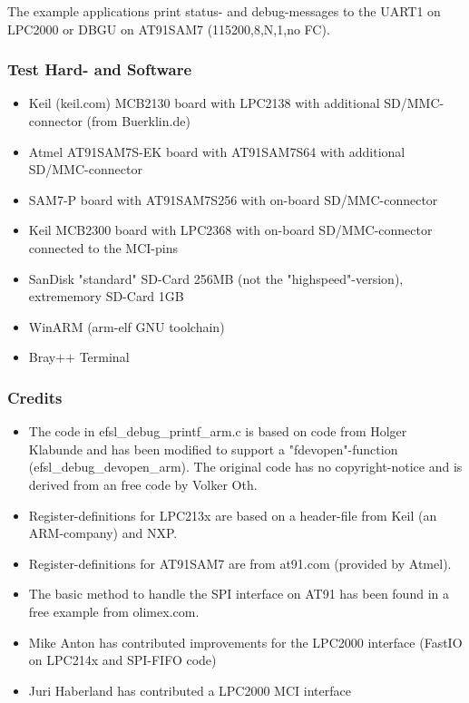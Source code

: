 The example applications print status- and 
debug-messages to the UART1 on LPC2000 or DBGU on AT91SAM7
(115200,8,N,1,no FC).


\subsubsection{Test Hard- and Software}
	\begin{itemize}

\item Keil (keil.com) MCB2130 board with LPC2138
with additional SD/MMC-connector (from Buerklin.de)

\item Atmel AT91SAM7S-EK board with AT91SAM7S64
with additional SD/MMC-connector

\item SAM7-P board with AT91SAM7S256
with on-board SD/MMC-connector

\item Keil MCB2300 board with LPC2368 with on-board
SD/MMC-connector connected to the MCI-pins

\item SanDisk "standard" SD-Card 256MB
(not the "highspeed"-version), extrememory SD-Card 1GB

\item WinARM (arm-elf GNU toolchain)

\item Bray++ Terminal

	\end{itemize}


\subsubsection{Credits}

\begin{itemize}

\item The code in efsl_debug_printf_arm.c is 
based on code from Holger Klabunde
and has been modified to support
a "fdevopen"-function (efsl_debug_devopen_arm). 
The original code has no copyright-notice and
is derived from an free code by Volker Oth.

\item Register-definitions for LPC213x are 
based on a header-file from Keil (an ARM-company) 
and NXP.

\item Register-definitions for AT91SAM7 are from 
at91.com (provided by Atmel).

\item The basic method to handle the SPI interface
on AT91 has been found in a free example from 
olimex.com.

\item Mike Anton has contributed improvements for the
LPC2000 interface (FastIO on LPC214x and SPI-FIFO code)

\item Juri Haberland has contributed a LPC2000
MCI interface

\end{itemize}

